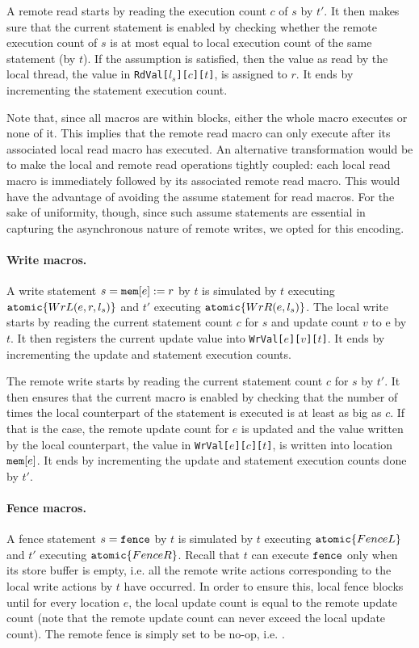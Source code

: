 A remote read starts by reading the execution count $c$ of $s$ by $t'$.
It then makes sure that the current statement is enabled by checking whether the remote execution count of $s$ is at most equal to local execution count of the same statement (by $t$).
If the assumption is satisfied, then the value as read by the local thread, the value in {\tt RdVal[$l_s$][$c$][$t$]}, is assigned to $r$.
It ends by incrementing the statement execution count.

Note that, since all macros are within {\aliatomic} blocks, either the whole macro executes or none of it. 
This implies that the remote read macro can only execute after its associated local read macro has executed.
An alternative transformation would be to make the local and remote read operations tightly coupled: each local read macro is immediately followed by its associated remote read macro.
This would have the advantage of avoiding the assume statement for read macros.
For the sake of uniformity, though, since such assume statements are essential in capturing the asynchronous nature of remote writes, we opted for this encoding.

\paragraph{Write macros.}
A write statement $s=\mathtt{mem}[e]:=r$ by $t$ is simulated by $t$ executing $\mathtt{atomic}\{WrL(e,r,l_s)\}$ and $t'$ executing $\mathtt{atomic}\{WrR(e,l_s)\}$.
The local write starts by reading the current statement count $c$ for $s$ and update count $v$ to {\alimemx e} by $t$.
It then registers the current update value into {\tt WrVal[$e$][$v$][$t$]}.
It ends by incrementing the update and statement execution counts.

The remote write starts by reading the current statement count $c$ for $s$ by $t'$.
It then ensures that the current macro is enabled by checking that the number of times the local counterpart of the statement is executed is at least as big as $c$.
If that is the case, the remote update count for $e$ is updated and the value written by the local counterpart, the value in {\tt WrVal[$e$][$c$][$t$]}, is written into location $\mathtt{mem}[e]$.
It ends by incrementing the update and statement execution counts done by $t'$.

\paragraph{Fence macros.}
A fence statement $s=\mathtt{fence}$ by $t$ is simulated by $t$ executing $\mathtt{atomic}\{FenceL\}$ and $t'$ executing $\mathtt{atomic}\{FenceR\}$.
Recall that $t$ can execute $\mathtt{fence}$ only when its store buffer is empty, i.e. all the remote write actions corresponding to the local write actions by $t$ have occurred.
In order to ensure this, local fence blocks until for every location $e$, the local update count is equal to the remote update count (note that the remote update count can never exceed the local update count). 
The remote fence is simply set to be no-op, i.e. \aliskip.

